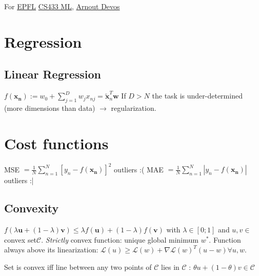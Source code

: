 For \href{https://epfl.ch}{EPFL} \href{https://edu.epfl.ch/coursebook/en/machine-learning-CS-433}{CS433 ML}, \textcopyright \href{https://arnoutdevos.github.io/}{Arnout Devos}
\section{Regression}
\subsection{Linear Regression}
$f(\mathbf{x_n}) := w_0 + \sum_{j=1}^D w_j x_{nj} = \tilde{\mathbf{x}}_n^T \mathbf{w}$\newline
If $D > N$ the task is under-determined (more dimensions than data) $\rightarrow$ regularization.

\section{Cost functions}
MSE $= \frac{1}{N} \sum_{n=1}^N [y_n - f(\mathbf{x_n})]^2$ outliers :(\newline
MAE $= \frac{1}{N} \sum_{n=1}^N |y_n - f(\mathbf{x_n})|$\space\space outliers :|\newline
\subsection{Convexity}
$f(\lambda \mathbf{u} + (1-\lambda)\mathbf{v}) \le \lambda f(\mathbf{u}) + (1-\lambda) f(\mathbf{v})$ with $\lambda \in [0;1]$ and $u,v\in$convex set$\mathcal{C}$.
\textit{Strictly} convex function: unique global minimum $w^*$. 
Function always above its linearization: \newline $\mathcal{L}(u) \ge \mathcal{L}(w) + \nabla \mathcal{L}(w)^T (u-w) \forall u,w$.

Set is convex iff line between any two points of $\mathcal{C}$ lies in $\mathcal{C}$ : $\theta u + (1 - \theta) v \in \mathcal{C}$

